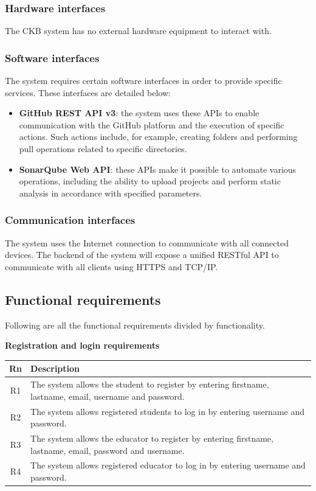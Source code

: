 \subsubsection{Hardware interfaces}
The CKB system has no external hardware equipment to interact with.

\subsubsection{Software interfaces}
The system requires certain software interfaces in order to provide specific services. These interfaces are detailed below:
\begin{itemize}
    \item \textbf{GitHub REST API v3}: the system uses these APIs to enable communication with the GitHub platform and the execution of specific actions. Such actions include, for example, creating folders and performing pull operations related to specific directories.

    \item \textbf{SonarQube Web API}: these APIs make it possible to automate various operations, including the ability to upload projects and perform static analysis in accordance with specified parameters.
\end{itemize}

\subsubsection{Communication interfaces}
The system uses the Internet connection to communicate with all connected devices.
The backend of the system will expose a unified RESTful API to communicate with all clients using HTTPS and TCP/IP.
\clearpage

\subsection{Functional requirements}
Following are all the functional requirements divided by functionality.
\newline

\textbf{Registration and login requirements }

\begin{tabular}{|c|p{13.2cm}|}
  \hline
  \textbf{Rn} & \textbf{Description} \\
  \hline
  R1 & The system allows the student to register by entering firstname, lastname, email, username and password. \\
  \hline
  R2 & The system allows registered students to log in by entering username and password.  \\
  \hline
  R3 & The system allows the educator to register by entering firstname, lastname, email, password and username. \\
  \hline
  R4 & The system allows registered educator to log in by entering username and password. \\
  \hline
\end{tabular}

